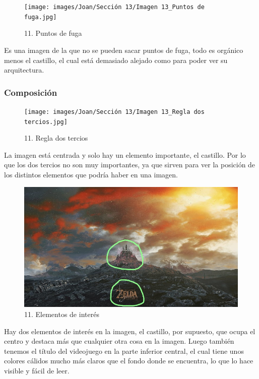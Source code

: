 \documentclass[12pt]{article}
\begin{document}
        \begin{figure}[H]
          \centering
          \texttt{[image: images/Joan/Sección 13/Imagen 13\_Puntos de fuga.jpg]}
          \caption{\small 11. Puntos de fuga}
        \end{figure}
        Es una imagen de la que no se pueden sacar puntos de fuga, todo es orgánico menos el castillo, el cual está demasiado alejado como para poder ver su arquitectura. 

            \subsubsection{Composición}
            \begin{figure}[H]
          \centering
          \texttt{[image: images/Joan/Sección 13/Imagen 13\_Regla dos tercios.jpg]}
          \caption{\small 11. Regla dos tercios}
        \end{figure}
        La imagen está centrada y solo hay un elemento importante, el castillo. Por lo que los dos tercios no son muy importantes, ya que sirven para ver la posición de los distintos elementos que podría haber en una imagen. 

        \begin{figure}[H]
          \centering
          \includegraphics[width=\textwidth]{images/Joan/Sección 13/Imagen 13_Elementos de interés.jpg}
          \caption{\small 11. Elementos de interés}
        \end{figure}
        Hay dos elementos de interés en la imagen, el castillo, por supuesto, que ocupa el centro y destaca más que cualquier otra cosa en la imagen. Luego también tenemos el título del videojuego en la parte inferior central, el cual tiene unos colores cálidos mucho más claros que el fondo donde se encuentra, lo que lo hace visible y fácil de leer. 
\end{document}
